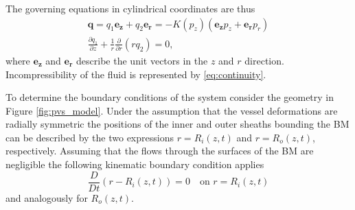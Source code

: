 \documentclass{frontiersFPHY} %
\newcommand{\q}{\boldsymbol{q}}
\newcommand{\dd}{\partial}
\newcommand{\vect}[1]{\boldsymbol{#1}}
\begin{document}
The governing equations in cylindrical coordinates are thus
\begin{gather}
  \q = q_1 \vect{e_z} + q_2 \vect{e_r} = - K(p_z) \left( \vect{e_z} p_z + \vect{e_r} p_r \right) \label{eq:darcy_velocity}\\
  \frac{\dd q_1}{\dd z} + \frac{1}{r} \frac{\dd}{\dd r} \left( r q_2 \right) = 0 \label{eq:continuity},
\end{gather}
where $\vect{e_z}$ and $\vect{e_r}$ describe the unit vectors in the $z$ and $r$ direction. Incompressibility of the fluid is represented by \eqref{eq:continuity}.

To determine the boundary conditions of the system consider the geometry in Figure \ref{fig:pvs_model}. Under the assumption that the vessel deformations are radially symmetric the positions of the inner and outer sheaths bounding the BM can be described by the two expressions $r = R_i(z,t)$ and $r = R_o(z,t)$, respectively. Assuming that the flows through the surfaces of the BM are negligible the following kinematic boundary condition applies
\begin{equation} \label{eq:kinematic}  
\frac{D}{D t} \left( r - R_i(z,t) \right) = 0 \quad \text{on } r = R_i(z,t)
\end{equation}
and analogously for $R_o(z,t)$.
\end{document}
